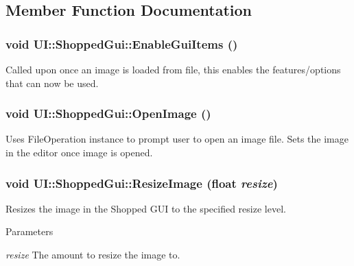 \subsection{Member Function Documentation}
\hypertarget{class_u_i_1_1_shopped_gui_a190bba777e57891c8042b86afbba83c6}{
\subsubsection[{EnableGuiItems}]{\setlength{\rightskip}{0pt plus 5cm}void UI::ShoppedGui::EnableGuiItems ()}}
\label{class_u_i_1_1_shopped_gui_a190bba777e57891c8042b86afbba83c6}
Called upon once an image is loaded from file, this enables the features/options that can now be used. \hypertarget{class_u_i_1_1_shopped_gui_a3a27f074b7b204b1df148921a0dcc20c}{
\subsubsection[{OpenImage}]{\setlength{\rightskip}{0pt plus 5cm}void UI::ShoppedGui::OpenImage ()}}
\label{class_u_i_1_1_shopped_gui_a3a27f074b7b204b1df148921a0dcc20c}
Uses FileOperation instance to prompt user to open an image file. Sets the image in the editor once image is opened. \hypertarget{class_u_i_1_1_shopped_gui_af17943aa92b2c904e67d2e73dc355fdd}{
\subsubsection[{ResizeImage}]{\setlength{\rightskip}{0pt plus 5cm}void UI::ShoppedGui::ResizeImage (float {\em resize})}}
\label{class_u_i_1_1_shopped_gui_af17943aa92b2c904e67d2e73dc355fdd}
Resizes the image in the Shopped GUI to the specified resize level. 
\begin{DoxyParams}{Parameters}
\item[{\em resize}]The amount to resize the image to. \end{DoxyParams}
